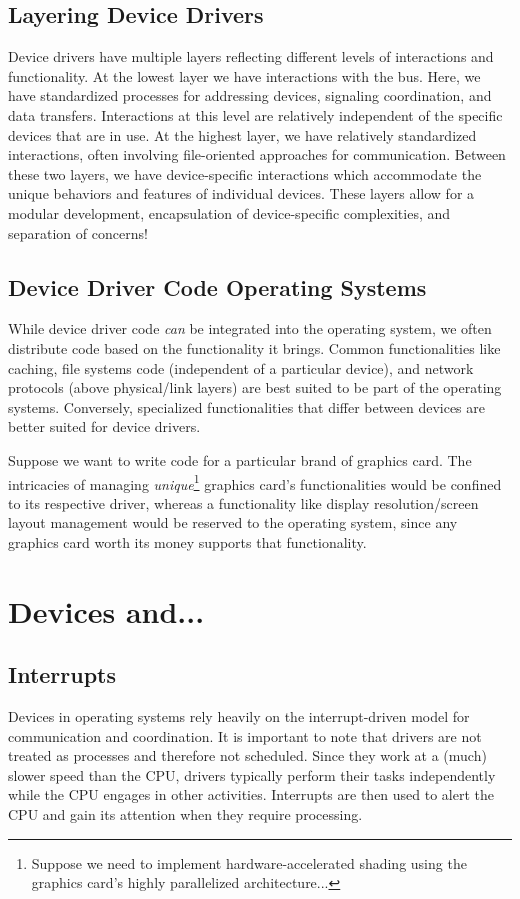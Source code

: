 \documentclass{report}
\newcommand{\exampleBegin}[1]{\begin{tcolorbox}[colback=blue!5!white,colframe=black!75!blue,title={Example:
      #1}]}
\newcommand{\exampleEnd}{\end{tcolorbox}}
\begin{document}
\subsection{Layering Device Drivers}
Device drivers have multiple layers reflecting different levels of interactions and
functionality. At the lowest layer we have interactions with the bus. Here, we have standardized
processes for addressing devices, signaling coordination, and data transfers. Interactions at this
level are relatively independent of the specific devices that are in use. At the highest layer, we
have relatively standardized interactions, often involving file-oriented approaches for
communication. Between these two layers, we have device-specific interactions which accommodate the
unique behaviors and features of individual devices. These layers allow for a modular development,
encapsulation of device-specific complexities, and separation of concerns!


\subsection{Device Driver Code Operating Systems}
While device driver code \textit{can} be integrated into the operating system, we often distribute
code based on the functionality it brings. Common functionalities like caching, file systems code
(independent of a particular device), and network protocols (above physical/link layers) are best
suited to be part of the operating systems. Conversely, specialized functionalities that differ
between devices are better suited for device drivers.

\exampleBegin{Graphics Drivers}
Suppose we want to write code for a particular brand of graphics card. The intricacies of managing
\textit{unique}\footnote{Suppose we need to implement hardware-accelerated shading using the
  graphics card's highly parallelized architecture...} graphics card's functionalities would be
confined to its respective driver, whereas a functionality like display resolution/screen layout
management would be reserved to the operating system, since any graphics card worth its money
supports that functionality.
\exampleEnd





\section{Devices and...}
\subsection{Interrupts}
\label{subsec:INTER}
Devices in operating systems rely heavily on the interrupt-driven model for communication and
coordination. It is important to note that drivers are not treated as processes and therefore not
scheduled. Since they work at a (much) slower speed than the CPU, drivers typically perform their
tasks independently while the CPU engages in other activities. Interrupts are then used to alert the
CPU and gain its attention when they require processing.
\end{document}
